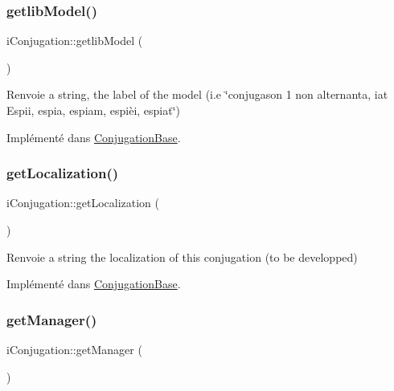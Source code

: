 \subsubsection{\texorpdfstring{getlib\+Model()}{getlibModel()}}
{\footnotesize\ttfamily i\+Conjugation\+::getlib\+Model (\begin{DoxyParamCaption}{ }\end{DoxyParamCaption})}

\begin{DoxyReturn}{Renvoie}
a string, the label of the model (i.\+e \char`\"{}conjugason 1 non alternanta, iat Espii, espia, espiam, espièi, espiat\char`\"{}) 
\end{DoxyReturn}


Implémenté dans \hyperlink{classConjugationBase_a52db22137154c2fd7a8487406b959652}{Conjugation\+Base}.

\hypertarget{interfaceiConjugation_ab19ceb5ab295fd3d0f862d963379a7e2}{}\label{interfaceiConjugation_ab19ceb5ab295fd3d0f862d963379a7e2} 
\subsubsection{\texorpdfstring{get\+Localization()}{getLocalization()}}
{\footnotesize\ttfamily i\+Conjugation\+::get\+Localization (\begin{DoxyParamCaption}{ }\end{DoxyParamCaption})}

\begin{DoxyReturn}{Renvoie}
a string the localization of this conjugation (to be developped) 
\end{DoxyReturn}


Implémenté dans \hyperlink{classConjugationBase_a27cc8f5f2a3b502e48c22a5b547181ac}{Conjugation\+Base}.

\hypertarget{interfaceiConjugation_a448829b47813a79d1f8ec65de91e8696}{}\label{interfaceiConjugation_a448829b47813a79d1f8ec65de91e8696} 
\subsubsection{\texorpdfstring{get\+Manager()}{getManager()}}
{\footnotesize\ttfamily i\+Conjugation\+::get\+Manager (\begin{DoxyParamCaption}{ }\end{DoxyParamCaption})}

